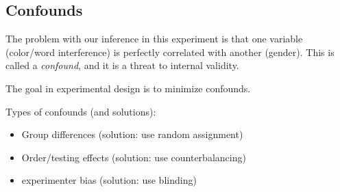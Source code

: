\documentclass[11pt]{article}
\begin{document}
\subsection*{Confounds}
\label{sec-3-2}

The problem with our inference in this experiment is that one variable (color/word interference) is perfectly correlated with another (gender).  This is called a \emph{confound}, and it is a threat to internal validity.

The goal in experimental design is to minimize confounds.

Types of confounds (and solutions):
\begin{itemize}
\item Group differences (solution: use random assignment)
\item Order/testing effects (solution: use counterbalancing)
\item experimenter bias (solution: use blinding)
\end{itemize}
\end{document}
